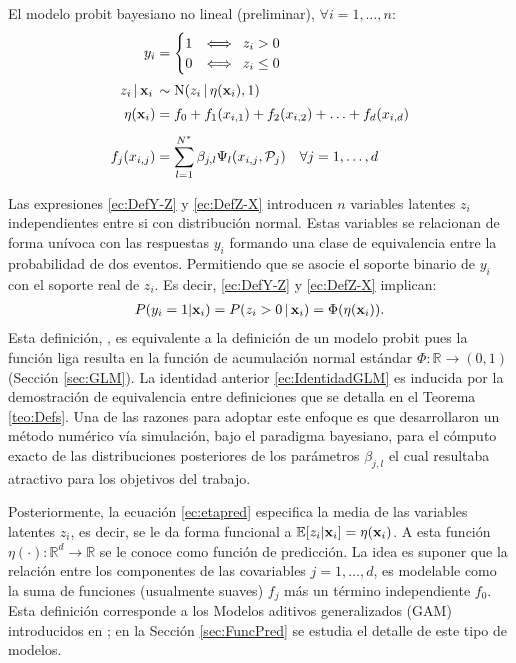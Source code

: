 \documentclass[../Main/Main.tex]{subfiles}
\begin{document}
\pagebreak
\begin{definition} \label{def:BPWPMPrelim}
El modelo probit bayesiano no lineal (preliminar), $\forall i = 1,\ldots,n$: 
\begin{align}
y_i &= 
	\begin{cases}
		1 & \Longleftrightarrow \enspace z_i > 0 \\									0 & \Longleftrightarrow \enspace z_i \leq 0
	\end{cases} \label{ec:DefY-Z} \\[2pt]
z_i\,|\,\mathbf{x}_i\, &\sim \text{N}(z_i\,|\,\eta(\mathbf{x}_i),1) \label{ec:DefZ-X} \\[2pt]
\eta(\mathbf{x}_i) &= f_0 + f_1(x_{i,1}) + f_2(x_{i,2}) + \ldots + f_d(x_{i,d}) \label{ec:etapred} \\[4pt]
f_j(x_{i,j}) &= \sum_{l = 1}^{N^*} \beta_{j,l} \Psi_l(x_{i,j}, \mathcal{P}_j) \quad \forall j = 1,\ldots,d \label{ec:fj}
\end{align}	
\end{definition}
Las expresiones \eqref{ec:DefY-Z} y \eqref{ec:DefZ-X} introducen $n$ variables latentes $z_i$ independientes entre si con distribución normal. Estas variables se relacionan de forma unívoca con las respuestas $y_i$ formando una clase de equivalencia entre la probabilidad de dos eventos.  Permitiendo que se asocie el soporte binario de $y_i$ con el soporte real de $z_i$. Es decir, \eqref{ec:DefY-Z} y \eqref{ec:DefZ-X} implican:
\begin{align}
	P(y_i = 1 |\mathbf{x}_i) = P(z_i > 0 \,|\, \mathbf{x}_i) = \Phi(\eta(\mathbf{x}_i)). 	\label{ec:IdentidadGLM}
\end{align}
Esta definición, \citet{albert1993bayesian}, es equivalente a la definición de un modelo probit pues la función liga resulta en la función de acumulación normal estándar $\Phi:\mathbb{R}\rightarrow (0,1)$ (Sección \ref{sec:GLM}). La identidad anterior \eqref{ec:IdentidadGLM} es inducida por la demostración de equivalencia entre definiciones que se detalla en el Teorema \ref{teo:Defs}. Una de las razones para adoptar este enfoque es que \citeauthor{albert1993bayesian} desarrollaron un método numérico vía simulación, bajo el paradigma bayesiano, para el cómputo exacto de las distribuciones posteriores de los parámetros $\beta_{j,l}$ el cual resultaba atractivo para los objetivos del trabajo.
 
Posteriormente, la ecuación \eqref{ec:etapred} especifica la media de las variables latentes $z_i$, es decir, se le da forma funcional a $\mathbb{E}[z_i|\mathbf{x}_i] = \eta(\mathbf{x}_i)$. A esta función $\eta(\cdot):\mathbb{R}^d\rightarrow\mathbb{R}$ se le conoce como función de predicción. La idea es suponer que la relación entre los componentes de las covariables $j = 1,\ldots,d$, es modelable como la suma de funciones (usualmente suaves) $f_j$ más un término independiente $f_0$. Esta definición corresponde a los Modelos  aditivos generalizados (GAM) introducidos en \citet{hastie1986generalized}; en la Sección \ref{sec:FuncPred} se estudia el detalle de este tipo de modelos.
\end{document}

